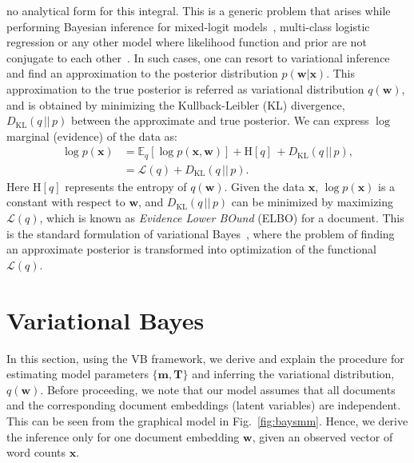 \documentclass[journal]{IEEEtran}
\newcommand{\mb}[1]{\bm{#1}}
\newcommand{\kl}{D_{\mathrm{KL}}}
\begin{document}
no analytical form for this integral. This is a generic problem that arises 
while performing Bayesian inference for mixed-logit 
models~\cite{Blei:2005:CTM,Depraetere:2017:mixed}, multi-class 
logistic regression or any other model where likelihood function and prior are 
not conjugate to each other~\cite{Bishop:2006:PRML}. In such cases, one can 
resort to variational inference and find an approximation to the posterior 
distribution \(p(\mb{w} | \mb{x})\). This approximation to the true posterior 
is referred as variational distribution \(q(\mb{w})\), and is obtained by 
minimizing the Kullback-Leibler (KL) divergence, \(\kl(q \,||\, p)\) between 
the approximate and true posterior. We can express \(\log\) marginal (evidence) 
of the data as:
\begin{align}
\log p(\mb{x}) &=  \mathbb{E}_q[\log p(\mb{x}, \mb{w})] + \mathrm{H}[q] \, + \kl(q \,||\, p), \label{eq_log_marginal_a}   \\
{}&=  \mathcal{L}(q)  + \kl(q \,||\, p). \label{eq_log_marginal_b}
\end{align}
Here \(\mathrm{H}[q]\) represents the entropy of \(q(\mb{w})\).
Given the data \(\mb{x}\), \(\log p(\mb{x})\) is a constant with respect to \(\mb{w}\), and \(\kl(q \,||\, p)\) can be minimized by maximizing \(\mathcal{L}(q)\), which is known as \textit{Evidence Lower BOund}  (ELBO) for a document. This is the standard formulation of variational Bayes~\cite{Bishop:2006:PRML}, where the problem of finding an approximate posterior is transformed into optimization of the functional \(\mathcal{L}(q)\).
\section{Variational Bayes}
\label{sec:vi}
In this section, using the VB framework, we derive and explain the procedure 
for estimating model parameters \(\{\mb{m}, \mb{T}\}\) and inferring the 
variational distribution, \(q(\mb{w})\). Before proceeding, we note that our 
model assumes that all documents and the corresponding document embeddings 
(latent variables) are independent. This can be seen from the graphical model 
in Fig.~\ref{fig:baysmm}. Hence, we derive the inference only for one document 
embedding \(\mb{w}\), given an observed vector of word counts \(\mb{x}\).
\end{document}
